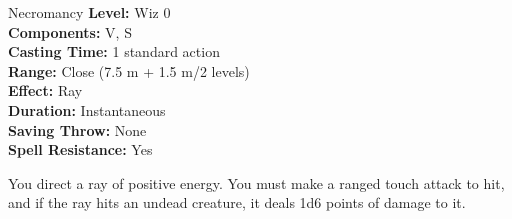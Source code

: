 {Necromancy}
{
	\textbf{Level:}
	Wiz 0\\
	\textbf{Components:}
	V, S\\
	\textbf{Casting Time:}
	1 standard action\\
	\textbf{Range:}
	Close (7.5 m + 1.5 m/2 levels)\\
	\textbf{Effect:}
	Ray\\
	\textbf{Duration:}
	Instantaneous\\
	\textbf{Saving Throw:}
	None\\
	\textbf{Spell Resistance:}
	Yes\\
}
{
	You direct a ray of positive energy. You must make a ranged touch attack to hit, and if the ray hits an undead creature, it deals 1d6 points of damage to it.

}
